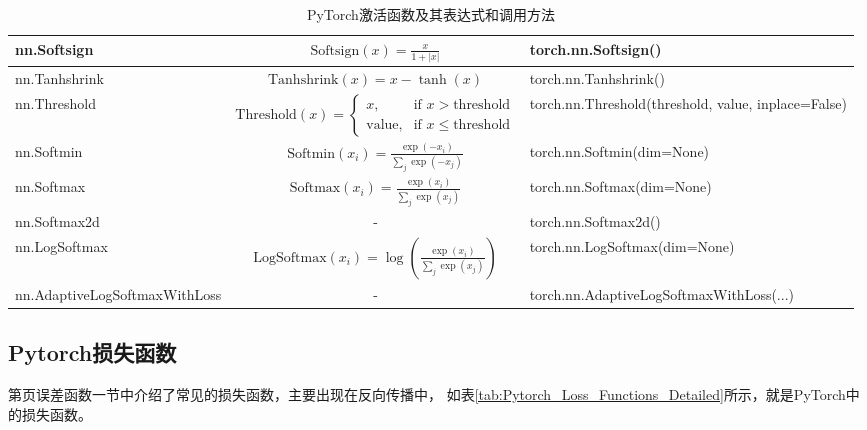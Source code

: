 \begin{table}[h]
{\begin{tabular}{|l|c|l|}
        nn.Softsign & $\text{Softsign}(x) = \frac{x}{1 + |x|}$ & torch.nn.Softsign() \\ \hline
        nn.Tanhshrink & $\text{Tanhshrink}(x) = x - \tanh(x)$ & torch.nn.Tanhshrink() \\ \hline
        nn.Threshold & $\text{Threshold}(x) = \begin{cases} x, & \text{if } x > \text{threshold} \\ \text{value}, & \text{if } x \leq \text{threshold} \end{cases}$ & torch.nn.Threshold(threshold, value, inplace=False) \\ \hline
        nn.Softmin & $\text{Softmin}(x_i) = \frac{\exp(-x_i)}{\sum_j \exp(-x_j)}$ & torch.nn.Softmin(dim=None) \\ \hline
        nn.Softmax & $\text{Softmax}(x_i) = \frac{\exp(x_i)}{\sum_j \exp(x_j)}$ & torch.nn.Softmax(dim=None) \\ \hline
        nn.Softmax2d & - & torch.nn.Softmax2d() \\ \hline
        nn.LogSoftmax & $\text{LogSoftmax}(x_i) = \log\left(\frac{\exp(x_i)}{\sum_j \exp(x_j)}\right)$ & torch.nn.LogSoftmax(dim=None) \\ \hline
        nn.AdaptiveLogSoftmaxWithLoss & - & torch.nn.AdaptiveLogSoftmaxWithLoss(...) \\ \hline
    \end{tabular}
}
\caption{PyTorch激活函数及其表达式和调用方法}
\label{tab:Pytorch_Activation_Expressions}
\end{table}

\subsection{Pytorch损失函数}
\label{subsubsec:Pytorch_nn_functional_loss_function}
第\pageref{subsec:误差函数}页误差函数一节中介绍了常见的损失函数，主要出现在反向传播中，
如表\ref{tab:Pytorch_Loss_Functions_Detailed}所示，就是PyTorch中的损失函数。

